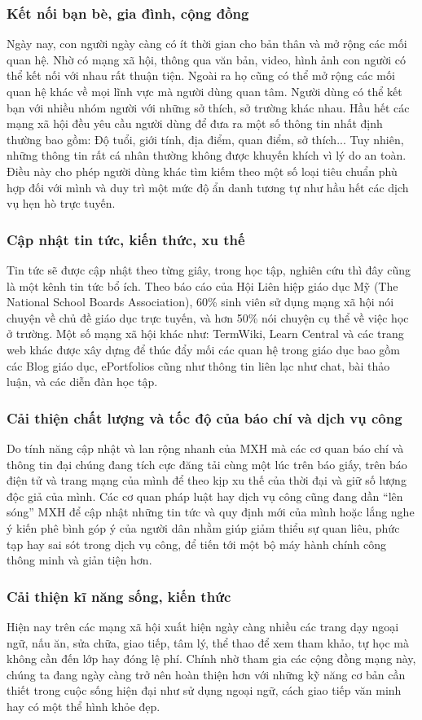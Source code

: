 		\subsubsection{Kết nối bạn bè, gia đình, cộng đồng}
		Ngày nay, con người ngày càng có ít thời gian cho bản thân và mở rộng các mối quan hệ. Nhờ có mạng xã hội, thông qua văn bản, video, hình ảnh con người có thể kết nối với nhau rất thuận tiện. Ngoài ra họ cũng có thể mở rộng các mối quan hệ khác về mọi lĩnh vực mà người dùng quan tâm. Người dùng có thể kết bạn với nhiều nhóm người với những sở thích, sở trường khác nhau. Hầu hết các mạng xã hội đều yêu cầu người dùng để đưa ra một số thông tin nhất định thường bao gồm: Độ tuổi, giới tính, địa điểm, quan điểm, sở thích... Tuy nhiên, những thông tin rất cá nhân thường không được khuyến khích vì lý do an toàn. Điều này cho phép người dùng khác tìm kiếm theo một số loại tiêu chuẩn phù hợp đối với mình và duy trì một mức độ ẩn danh tương tự như hầu hết các dịch vụ hẹn hò trực tuyến.
		\subsubsection{Cập nhật tin tức, kiến thức, xu thế}
		Tin tức sẽ được cập nhật theo từng giây, trong học tập, nghiên cứu thì đây cũng là một kênh tin tức bổ ích. Theo báo cáo của Hội Liên hiệp giáo dục Mỹ (The National School Boards Association), 60\% sinh viên sử dụng mạng xã hội nói chuyện về chủ đề giáo dục trực tuyến, và hơn 50\% nói chuyện cụ thể về việc học ở trường. Một số mạng xã hội khác như: TermWiki, Learn Central và các trang web khác được xây dựng để thúc đẩy mối các quan hệ trong giáo dục bao gồm các Blog giáo dục, ePortfolios cũng như thông tin liên lạc như chat, bài thảo luận, và các diễn đàn học tập.
		\subsubsection{Cải thiện chất lượng và tốc độ của báo chí và dịch vụ công}
		Do tính năng cập nhật và lan rộng nhanh của MXH mà các cơ quan báo chí và thông tin đại chúng đang tích cực đăng tải cùng một lúc trên báo giấy, trên báo điện tử và trang mạng của mình để theo kịp xu thế của thời đại và giữ số lượng độc giả của mình. Các cơ quan pháp luật hay dịch vụ công cũng đang dần “lên sóng” MXH để cập nhật những tin tức và quy định mới của mình hoặc lắng nghe ý kiến phê bình góp ý của người dân nhằm giúp giảm thiểu sự quan liêu, phức tạp hay sai sót trong dịch vụ công, để tiến tới một bộ máy hành chính công thông minh và giản tiện hơn.
		\subsubsection{Cải thiện kĩ năng sống, kiến thức}
		Hiện nay trên các mạng xã hội xuất hiện ngày càng nhiều các trang dạy ngoại ngữ, nấu ăn, sửa chữa, giao tiếp, tâm lý, thể thao để xem tham khảo, tự học mà không cần đến lớp hay đóng lệ phí. Chính nhờ tham gia các cộng đồng mạng này, chúng ta đang ngày càng trở nên hoàn thiện hơn với những kỹ năng cơ bản cần thiết trong cuộc sống hiện đại như sử dụng ngoại ngữ, cách giao tiếp văn minh hay có một thể hình khỏe đẹp.
